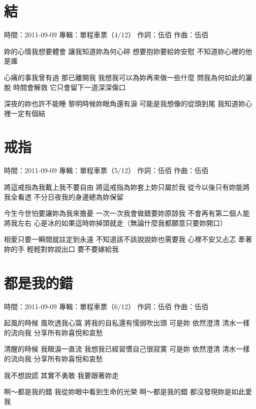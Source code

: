\documentclass[UTF8,a4paper,oneside,twocolumn,12pt]{ctexbook}
\newcommand{\infopair}[2]{\textbullet #1：#2}
\newcommand{\zc}[1][伍佰]{\infopair{作詞}{#1}}
\newcommand{\zq}[1][伍佰]{\infopair{作曲}{#1}}
\newcommand{\zj}[1]{\infopair{專輯}{#1}}
\newcommand{\sj}[1]{\infopair{時間}{#1}}
\newenvironment{info}{\begin{flushleft}\kaishu
	}
	{\end{flushleft}\normalsize\yahei\par}
\newenvironment{lyric}{
	}
{}
\begin{document}
\section{結}
\begin{info}
	\sj{2011-09-09}
	\zj{單程車票（4/12）}
	\zc
	\zq
\end{info}
\begin{lyric}
	妳的心情我想要體會
	讓我知道妳為何心碎
	想要抱妳要給妳安慰
	不知道妳心裡的他是誰

	心痛的事我曾有過 那已離開我
	我想我可以為妳再來做一些什麼
	問我為何如此的灑脫 時間會解救
	它只會留下一道深深傷口

	深夜的妳也許不能睡
	黎明時候妳眼角還有淚
	可能是我想像的從頭到尾
	我知道妳心裡一定有個結
\end{lyric}

\section{戒指}
\begin{info}
	\sj{2011-09-09}
	\zj{單程車票（5/12）}
	\zc
	\zq
\end{info}
\begin{lyric}
	將這戒指為我戴上我不要自由
	將這戒指為妳套上妳只屬於我
	從今以後只有妳能將我全看透
	不分日夜我的身邊總為妳保留

	今生今世怕要讓妳為我來擔憂
	一次一次我會做錯要妳原諒我
	不會再有第二個人能將我左右
	心是冰的如果這時妳掉頭就走（無論什麼我都願意只要妳開口）

	相愛只要一瞬間就註定到永遠
	不知道該不該說說妳也需要我
	心裡不安又忐忑 牽著妳的手
	輕輕對妳說出口 要不要嫁給我
\end{lyric}

\section{都是我的錯}
\begin{info}
	\sj{2011-09-09}
	\zj{單程車票（6/12）}
	\zc
	\zq
\end{info}
\begin{lyric}
	起風的時候 風吹透我心窩
	將我的自私還有懦弱吹出頭
	可是妳 依然澄清
	清水一樣的流向我
	分享所有妳喜悅和哀愁

	清醒的時候 我眼淚一直流
	我想我已經習慣自己很寂寞
	可是妳 依然澄清
	清水一樣的流向我
	分享所有妳喜悅和哀愁

	我不想說謊
	其實不勇敢
	我要跟著妳走

	啊～都是我的錯
	我從妳眼中看到生命的光榮
	啊～都是我的錯
	都沒發現妳是如此愛我
\end{lyric}
\end{document}
